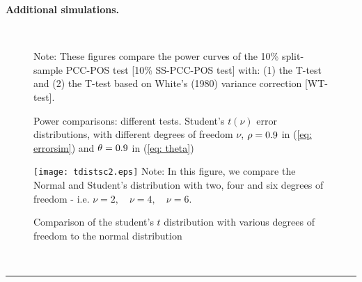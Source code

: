 \documentclass[harvard,11pt]{article}
\newenvironment{proof}[1][Proof]{\textbf{#1.} }{\  \rule{0.5em}{0.5em}}
\begin{document}
\begin{proof}[Additional simulations]
\begin{figure}[tbph]
\caption{Power comparisons: different tests. Student's $t(\nu)$ error distributions, with
different degrees of freedom $\nu$, $\protect\rho=0.9$ in (\protect\ref{eq: errorsim}) and $\protect%
\theta =0.9$ in (\protect\ref{eq: theta})}
\begin{center}
 \\[0pt]
\end{center}
\doublespacing
Note: These figures compare the power curves of the 10\% split-sample PCC-POS test
[10\% SS-PCC-POS test] with: (1) the T-test and (2) the T-test based
on White's (1980) variance correction [WT-test]. 
\label{fig: c24}
\end{figure}
\FloatBarrier
\begin{figure}
\caption{Comparison of the student's $t$ distribution with various degrees of freedom to the normal distribution}
\texttt{[image: tdistsc2.eps]}\label{fig: distos1}
Note: In this figure, we compare the Normal and Student's distribution with two, four and six degrees of freedom - i.e. $\nu=2,\quad \nu=4,\quad \nu=6$.
\label{fig: c25}
\end{figure}
\FloatBarrier
\end{proof}
\newpage


\end{document}
